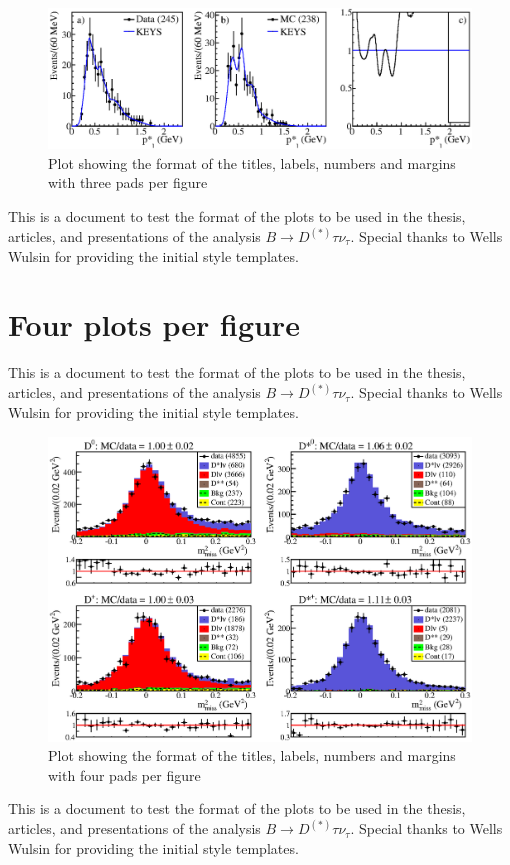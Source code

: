 \documentclass[12pt,twoside]{report}
\begin{document}
\begin{figure}[h]
\hspace{-0.15in}
\includegraphics[width=6.2in]{ContiWeightPl_1_90.eps}
\vspace{-0.2in}
\caption{Plot showing the format of the titles, labels, numbers and margins with three pads per figure}
\end{figure}
This is a document to test the format of the plots to be used in the thesis, articles,
and presentations of the analysis $B\to D^{(*)}\tau\nu_{\tau}$. 
Special thanks to Wells Wulsin for providing the initial style templates.

\newpage
\section{Four plots per figure}
This is a document to test the format of the plots to be used in the thesis, articles,
and presentations of the analysis $B\to D^{(*)}\tau\nu_{\tau}$. 
Special thanks to Wells Wulsin for providing the initial style templates.

\begin{figure}[h]
\hspace{-0.15in}
\includegraphics[width=6.2in]{noCutConv_candM2_All_both.eps}
\vspace{-0.1in}
\caption{Plot showing the format of the titles, labels, numbers and margins with four pads per figure}
\end{figure}
This is a document to test the format of the plots to be used in the thesis, articles,
and presentations of the analysis $B\to D^{(*)}\tau\nu_{\tau}$. 
Special thanks to Wells Wulsin for providing the initial style templates.
\end{document}

